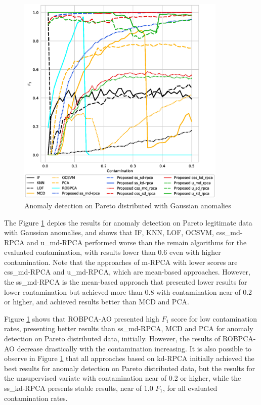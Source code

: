 \documentclass[review]{elsarticle}
\begin{document}
\begin{figure}[h!]
	\centering
	\includegraphics[width=10cm]{figures/pareto_f1_contamination.eps}
	\caption{Anomaly detection on Pareto distributed with Gaussian anomalies}
	\label{fig:4.11}
\end{figure}

The Figure \ref{fig:4.11} depics the results for anomaly detection on Pareto legitimate data with Gaussian anomalies, and shows that IF, KNN, LOF, OCSVM, css\_md-RPCA and u\_md-RPCA performed worse than the remain algorithms for the evaluated contamination, with results lower than 0.6 even with higher contamination. Note that the approaches of m-RPCA with lower scores are css\_md-RPCA and u\_md-RPCA, which are mean-based approaches. However, the ss\_md-RPCA is the mean-based approach that presented lower results for lower contamination but achieved more than 0.8 with contamination near of 0.2 or higher, and achieved results better than MCD and PCA.

Figure \ref{fig:4.11} shows that ROBPCA-AO presented high $F_1$ score for low contamination rates, presenting better results than ss\_md-RPCA, MCD and PCA for anomaly detection on Pareto distributed data, initially. However, the results of ROBPCA-AO decrease drastically with the contamination increasing. It is also possible to observe in Figure \ref{fig:4.11} that all approaches based on kd-RPCA initially achieved the best results for anomaly detection on Pareto distributed data, but the results for the unsupervised variate with contamination near of 0.2 or higher, while the ss\_kd-RPCA presents stable results, near of 1.0 $F_1$, for all evaluated contamination rates.
\end{document}

